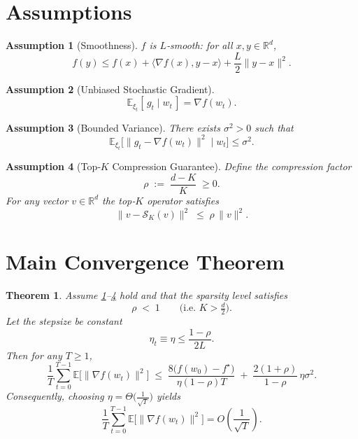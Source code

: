 \documentclass{article}
\newtheorem{assumption}{Assumption}
\newtheorem{theorem}{Theorem}
\newcommand{\topk}[1]{\mathcal{S}_K(#1)}
\begin{document}
\section*{Assumptions}
\begin{assumption}[Smoothness]\label{as:smooth}
$f$ is $L$‑smooth: for all $x,y\in\mathbb{R}^d$,
\[
f(y)\le f(x)+\langle\nabla f(x),y-x\rangle+\frac{L}{2}\|y-x\|^2 .
\]
\end{assumption}
\begin{assumption}[Unbiased Stochastic Gradient]\label{as:unbiased}
\[
\mathbb{E}_{\xi_t}[\,g_t\mid w_t\,]=\nabla f(w_t).
\]
\end{assumption}
\begin{assumption}[Bounded Variance]\label{as:variance}
There exists $\sigma^2>0$ such that
\[
\mathbb{E}_{\xi_t}\big[\|g_t-\nabla f(w_t)\|^2\mid w_t\big]\le\sigma^2 .
\]
\end{assumption}
\begin{assumption}[Top‑$K$ Compression Guarantee]\label{as:compress}
Define the compression factor
\[
\rho\;:=\;\frac{d-K}{K}\;\ge 0 .
\]
For any vector $v\in\mathbb{R}^d$ the top‑$K$ operator satisfies
\[
\|v-\topk{v}\|^2\;\le\;\rho\,\|v\|^2 . \tag{2}
\]
\end{assumption}

\section*{Main Convergence Theorem}
\begin{theorem}\label{thm:main}
Assume \ref{as:smooth}–\ref{as:compress} hold and that the sparsity level satisfies
\[
\rho \;<\;1\qquad\bigl(\text{i.e. }K>\tfrac{d}{2}\bigr).
\]
Let the stepsize be constant
\[
\eta_t\equiv\eta\le\frac{1-\rho}{2L}.
\]
Then for any $T\ge1$,
\[
\frac{1}{T}\sum_{t=0}^{T-1}\mathbb{E}\big[\|\nabla f(w_t)\|^2\big]
\;\le\;
\frac{8\big(f(w_0)-f^\star\big)}{\eta(1-\rho)T}
\;+\;
\frac{2(1+\rho)}{1-\rho}\,\eta\sigma^2 .
\tag{3}
\]
Consequently, choosing $\eta=\Theta\!\big(\tfrac{1}{\sqrt{T}}\big)$ yields
\[
\frac{1}{T}\sum_{t=0}^{T-1}\mathbb{E}\big[\|\nabla f(w_t)\|^2\big]
=O\!\left(\frac{1}{\sqrt{T}}\right).
\]
\end{theorem}
\end{document}
